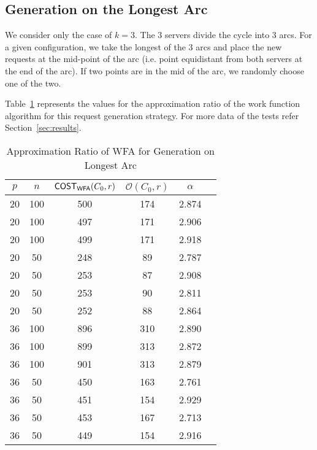 \subsection{Generation on the Longest Arc}

We consider only the case of $k=3$. The $3$ servers divide the cycle into $3$ arcs. For a given configuration, we take the longest of the $3$ arcs and place the new requests at the mid-point of the arc (i.e. point equidistant from both servers at the end of the arc). If two points are in the mid of the arc, we randomly choose one of the two.

Table~\ref{tab:mid-approx-ratio} represents the values for the approximation ratio of the work function algorithm for this request generation strategy. For more data of the tests refer Section~\ref{sec:results}.

\begin{table}[!ht]
\begin{center}
\begin{tabular}{|c|c|c|c|c|c|}
\hline
$p$ & $n$ & $\sf{COST}_{\sf{WFA}} (C_0,r)$ & $\mathcal{O}(C_0,r)$ & $\alpha$ \\
\hline
20 & 100 & 500 & 174 &	2.874   \\
20  & 100 & 497       & 171	& 2.906 \\
20  & 100 & 499       & 171	& 2.918 \\
20  & 50  & 248       & 89	& 2.787  \\
20  & 50  & 253       & 87	& 2.908  \\
20  & 50  & 253       & 90	& 2.811  \\
20  & 50  & 252       & 88	& 2.864  \\
36  & 100 & 896       & 310	& 2.890 \\
36  & 100 & 899       & 313	& 2.872 \\
36  & 100 & 901       & 313	& 2.879 \\
36  & 50  & 450       & 163	& 2.761 \\
36  & 50  & 451       & 154	& 2.929 \\
36  & 50  & 453       & 167	& 2.713 \\
36  & 50  & 449       & 154	& 2.916 \\
\hline
\end{tabular}
\caption{Approximation Ratio of WFA for Generation on Longest Arc}
\label{tab:mid-approx-ratio}
\end{center}
\end{table}


